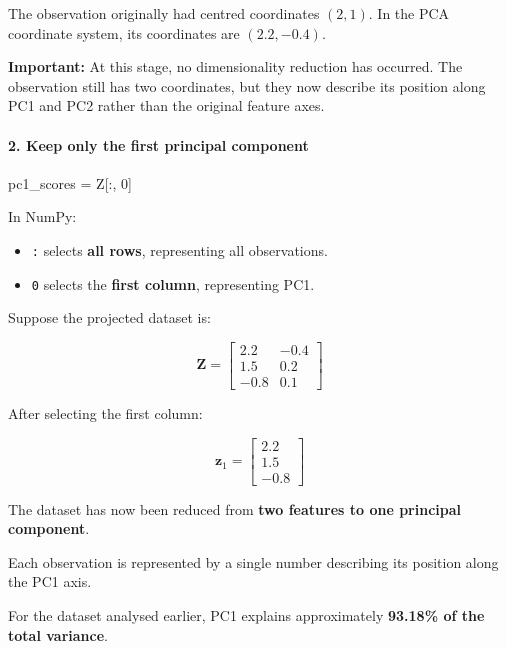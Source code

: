 \documentclass[11pt]{article}
\providecommand{\tightlist}{%
      \setlength{\itemsep}{0pt}\setlength{\parskip}{0pt}}
\newenvironment{Shaded}{}{}
\newcommand{\DecValTok}[1]{\textcolor[rgb]{0.25,0.63,0.44}{{#1}}}
\newcommand{\NormalTok}[1]{{#1}}
\newcommand{\OperatorTok}[1]{\textcolor[rgb]{0.40,0.40,0.40}{{#1}}}
\begin{document}
The observation originally had centred coordinates \((2,1)\). In the PCA
coordinate system, its coordinates are \((2.2,-0.4)\).

\textbf{Important:} At this stage, no dimensionality reduction has
occurred. The observation still has two coordinates, but they now
describe its position along PC1 and PC2 rather than the original feature
axes.

\paragraph{2. Keep only the first principal
component}\label{keep-only-the-first-principal-component}

\begin{Shaded}
\begin{Highlighting}[]
\NormalTok{pc1\_scores }\OperatorTok{=}\NormalTok{ Z[:, }\DecValTok{0}\NormalTok{]}
\end{Highlighting}
\end{Shaded}

In NumPy:

\begin{itemize}
\tightlist
\item
  \texttt{:} selects \textbf{all rows}, representing all observations.
\item
  \texttt{0} selects the \textbf{first column}, representing PC1.
\end{itemize}

Suppose the projected dataset is:

\[
\mathbf Z=
\begin{bmatrix}
2.2 & -0.4\\
1.5 & 0.2\\
-0.8 & 0.1
\end{bmatrix}
\]

After selecting the first column:

\[
\mathbf z_1=
\begin{bmatrix}
2.2\\
1.5\\
-0.8
\end{bmatrix}
\]

The dataset has now been reduced from \textbf{two features to one
principal component}.

Each observation is represented by a single number describing its
position along the PC1 axis.

For the dataset analysed earlier, PC1 explains approximately
\textbf{93.18\% of the total variance}.
\end{document}
